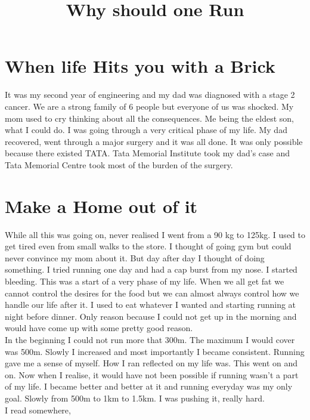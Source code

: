 \documentclass[]{article}
\begin{document}
\title{Why should one Run}
\date{}
\maketitle

\section*{When life Hits you with a Brick}
It was my second year of engineering and my dad was diagnosed with a stage 2 cancer. We are a strong family of 6 people but everyone of us was shocked. My mom used to cry thinking about all the consequences. Me being the eldest son, what I could do. I was going through a very critical phase of my life. My dad recovered, went through a major surgery and it was all done. It was only possible because there existed TATA. Tata Memorial Institute took my dad's case and Tata Memorial Centre took most of the burden of the surgery.  
\section*{ Make a Home out of it }
While all this was going on, never realised I went from a 90 kg to 125kg. I used to get tired even from small walks to the store. I thought of going gym but could never convince my mom about it. 
But day after day I thought of doing something. I tried running one day and had a cap burst from my nose. I started bleeding. This was a start of a very phase of my life. When we all get fat we cannot control the desires for the food but we can almost always control how we handle our life after it. I used to eat whatever I wanted and starting running at night before dinner. Only reason because I could not get up in the morning and would have come up with some pretty good reason.\\
In the beginning I could not run more that 300m. The maximum I would cover was 500m. 
Slowly I increased and most importantly I became consistent. Running gave me a sense of myself. How I ran reflected on my life was. This went on and on. Now when I realise, it would have not been possible if running wasn't a part of my life. I became better and better at it and running everyday was my only goal. Slowly from 500m to 1km to 1.5km. I was pushing it, really hard.\\
I read somewhere, 
\begin{quote}
\end{quote} 
\end{document}
